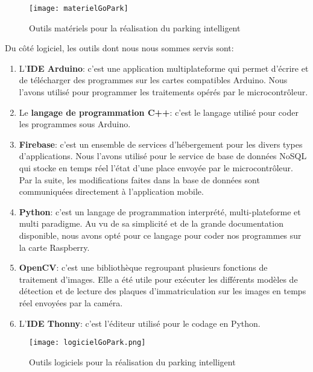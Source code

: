     \begin{figure}
        \centering
        \texttt{[image: materielGoPark]}
        \caption{Outils matériels pour la réalisation du parking intelligent}
    \end{figure}

    Du côté logiciel, les outils dont nous nous sommes servis sont:
    \begin{enumerate}
        \item L’\textbf{IDE Arduino}: c’est une application multiplateforme qui permet d’écrire et de télécharger des programmes sur les cartes compatibles Arduino. Nous l’avons utilisé pour programmer les traitements opérés par le microcontrôleur. 
        \item Le \textbf{langage de programmation C++}: c’est le langage utilisé pour coder les programmes sous Arduino.
        \item \textbf{Firebase}: c’est un ensemble de services d’hébergement pour les divers types d'applications. Nous l’avons utilisé pour le service de base de données NoSQL qui stocke en temps réel l’état d'une place envoyée par le microcontrôleur. Par la suite, les modifications faites dans la base de données sont communiquées directement à l'application mobile.
        \item \textbf{Python}: c’est un langage de programmation interprété, multi-plateforme et multi paradigme. Au vu de sa simplicité et de la grande documentation disponible, nous avons opté pour ce langage pour coder nos programmes sur la carte Raspberry. 
        \item \textbf{OpenCV}: c’est une bibliothèque regroupant plusieurs fonctions de traitement d’images. Elle a été utile pour exécuter les différents modèles de détection et de lecture des plaques d'immatriculation sur les images en temps réel envoyées par la caméra.
        \item L’\textbf{IDE Thonny}: c'est l'éditeur utilisé pour le codage en Python.
    \end{enumerate}
    \begin{figure}
        \centering
        \texttt{[image: logicielGoPark.png]}
        \caption{Outils logiciels pour la réalisation du parking intelligent}
    \end{figure}

